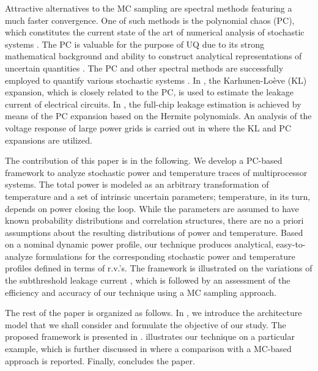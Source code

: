 Attractive alternatives to the MC sampling are spectral methods \cite{ghanem1991, xiu2010, maitre2010} featuring a much faster convergence. One of such methods is the polynomial chaos (PC), which constitutes the current state of the art of numerical analysis of stochastic systems \cite{xiu2009}. The PC is valuable for the purpose of UQ due to its strong mathematical background and ability to construct analytical representations of uncertain quantities \cite{eldred2009}. The PC and other spectral methods are successfully employed to quantify various stochastic systems \cite{xiu2010}. In \cite{bhardwaj2006}, the Karhunen-Lo\`{e}ve (KL) expansion, which is closely related to the PC, is used to estimate the leakage current of electrical circuits. In \cite{shen2009}, the full-chip leakage estimation is achieved by means of the PC expansion based on the Hermite polynomials. An analysis of the voltage response of large power grids is carried out in \cite{ghanta2006} where the KL and PC expansions are utilized.

The contribution of this paper is in the following. We develop a PC-based framework to analyze stochastic power and temperature traces of multiprocessor systems. The total power is modeled as an arbitrary transformation of temperature and a set of intrinsic uncertain parameters; temperature, in its turn, depends on power closing the loop. While the parameters are assumed to have known probability distributions and correlation structures, there are no a priori assumptions about the resulting distributions of power and temperature. Based on a nominal dynamic power profile, our technique produces analytical, easy-to-analyze formulations for the corresponding stochastic power and temperature profiles defined in terms of r.v.'s. The framework is illustrated on the variations of the subthreshold leakage current \cite{srivastava2010}, which is followed by an assessment of the efficiency and accuracy of our technique using a MC sampling approach.

The rest of the paper is organized as follows. In , we introduce the architecture model that we shall consider and formulate the objective of our study. The proposed framework is presented in .  illustrates our technique on a particular example, which is further discussed in  where a comparison with a MC-based approach is reported. Finally,  concludes the paper.
